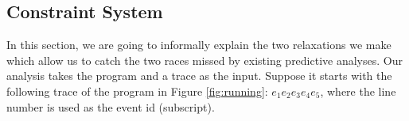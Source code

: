 



\subsection{Constraint System}
In this section, we are going to informally explain the two relaxations
we make which allow us to catch the two races missed by existing 
predictive analyses.
Our analysis takes the program and a trace as the input.  
Suppose it starts with the following trace of the program in  
Figure \ref{fig:running}:  $e_1 e_2 e_3 e_4 e_5$, where the line number 
is used as the event id (subscript). 

